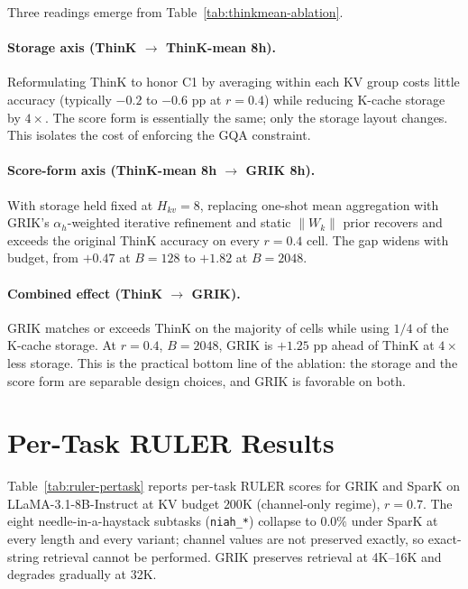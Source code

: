 \documentclass{article}
\begin{document}
Three readings emerge from Table~\ref{tab:thinkmean-ablation}.
 
\paragraph{Storage axis (ThinK $\to$ ThinK-mean 8h).} Reformulating ThinK to honor C1 by averaging within each KV group costs little accuracy (typically $-0.2$ to $-0.6$ pp at $r{=}0.4$) while reducing K-cache storage by $4\times$. The score form is essentially the same; only the storage layout changes. This isolates the cost of enforcing the GQA constraint.
 
\paragraph{Score-form axis (ThinK-mean 8h $\to$ GRIK 8h).} With storage held fixed at $H_{kv}{=}8$, replacing one-shot mean aggregation with GRIK's $\alpha_h$-weighted iterative refinement and static $\|W_k\|$ prior recovers and exceeds the original ThinK accuracy on every $r{=}0.4$ cell. The gap widens with budget, from $+0.47$ at $B{=}128$ to $+1.82$ at $B{=}2048$.
 
\paragraph{Combined effect (ThinK $\to$ GRIK).} GRIK matches or exceeds ThinK on the majority of cells while using $1/4$ of the K-cache storage. At $r{=}0.4$, $B{=}2048$, GRIK is $+1.25$ pp ahead of ThinK at $4\times$ less storage. This is the practical bottom line of the ablation: the storage and the score form are separable design choices, and GRIK is favorable on both.
 
 
\section{Per-Task RULER Results}
\label{app:ruler-pertask}
 
Table~\ref{tab:ruler-pertask} reports per-task RULER scores for GRIK and SparK on LLaMA-3.1-8B-Instruct at KV budget $200$K (channel-only regime), $r{=}0.7$. The eight needle-in-a-haystack subtasks (\texttt{niah\_*}) collapse to $0.0\%$ under SparK at every length and every variant; channel values are not preserved exactly, so exact-string retrieval cannot be performed. GRIK preserves retrieval at 4K--16K and degrades gradually at 32K.
 
\end{document}
